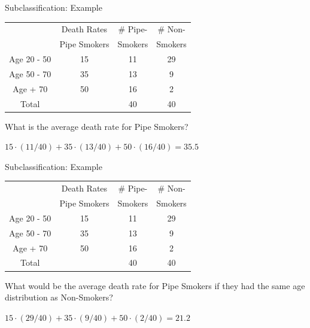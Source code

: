 \documentclass[xcolor=dvipsnames]{beamer}
\begin{document}
\begin{frame}{Subclassification: Example}

\begin{center}
\begin{tabular}{|c|c|c|c|}
\hline
\multicolumn{ 1}{|c|}{} & \multicolumn{ 1}{c|}{Death Rates  } & \# Pipe- & \# Non- \\

\multicolumn{ 1}{|c|}{} & \multicolumn{ 1}{c|}{Pipe Smokers} &  Smokers  &  Smokers \\
\hline
Age 20 - 50  &         15 &         11 &         29 \\
\hline
Age 50 - 70  &         35 &         13 &          9 \\
\hline
 Age + 70  &         50 &         16 &          2 \\
\hline
    Total  &            &         40 &         40 \\
\hline
\end{tabular}
\end{center}

What is the average death rate for Pipe Smokers? \pause

$15\cdot(11/40)+35\cdot(13/40)+50\cdot(16/40)=35.5$

\end{frame}

\begin{frame}{Subclassification: Example}

\begin{center}
\begin{tabular}{|c|c|c|c|}
\hline
\multicolumn{ 1}{|c|}{} & \multicolumn{ 1}{c|}{Death Rates  } & \# Pipe- & \# Non- \\

\multicolumn{ 1}{|c|}{} & \multicolumn{ 1}{c|}{Pipe Smokers} &  Smokers  &  Smokers \\
\hline
Age 20 - 50  &         15 &         11 &         29 \\
\hline
Age 50 - 70  &         35 &         13 &          9 \\
\hline
 Age + 70  &         50 &         16 &          2 \\
\hline
    Total  &            &         40 &         40 \\
\hline
\end{tabular}
\end{center}

What would be the average death rate for Pipe Smokers if they had the same age distribution as Non-Smokers? \pause

$15\cdot(29/40)+35\cdot(9/40)+50\cdot(2/40)=21.2$

\end{frame}
\end{document}
